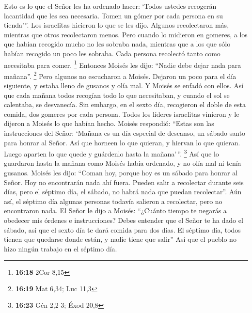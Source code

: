  Esto es lo que el Señor les ha ordenado hacer: `Todos
ustedes recogerán lacantidad que les sea necesaria. Tomen un gómer por
cada persona en su tienda'''.  Los israelitas hicieron lo
que se les dijo. Algunos recolectaron más, mientras que otros
recolectaron menos.  Pero cuando lo midieron en gomeres,
a los que habían recogido mucho no les sobraba nada, mientras que a los
que sólo habían recogido un poco les sobraba. Cada persona recolectó
tanto como necesitaba para comer. \footnote{\textbf{16:18} 2Cor 8,15}
 Entonces Moisés les dijo: ``Nadie debe dejar nada para
mañana''. \footnote{\textbf{16:19} Mat 6,34; Luc 11,3} 
Pero algunos no escucharon a Moisés. Dejaron un poco para el día
siguiente, y estaba lleno de gusanos y olía mal. Y Moisés se enfadó con
ellos.  Así que cada mañana todos recogían todo lo que
necesitaban, y cuando el sol se calentaba, se desvanecía.
 Sin embargo, en el sexto día, recogieron el doble de
esta comida, dos gomeres por cada persona. Todos los líderes israelitas
vinieron y le dijeron a Moisés lo que habían hecho. 
Moisés respondió: ``Estas son las instrucciones del Señor: `Mañana es un
día especial de descanso, un sábado santo para honrar al Señor. Así que
horneen lo que quieran, y hiervan lo que quieran. Luego aparten lo que
quede y guárdenlo hasta la mañana'\,''. \footnote{\textbf{16:23} Gén
  2,2-3; Éxod 20,8}  Así que lo guardaron hasta la mañana
como Moisés había ordenado, y no olía mal ni tenía gusanos.
 Moisés les dijo: ``Coman hoy, porque hoy es un sábado
para honrar al Señor. Hoy no encontrarán nada ahí fuera. 
Pueden salir a recolectar durante seis días, pero el séptimo día, el
sábado, no habrá nada que puedan recolectar''.  Aún así,
el séptimo día algunas personas todavía salieron a recolectar, pero no
encontraron nada.  El Señor le dijo a Moisés: ``¿Cuánto
tiempo te negarás a obedecer mis órdenes e instrucciones?
 Debes entender que el Señor te ha dado el sábado, así
que el sexto día te dará comida para dos días. El séptimo día, todos
tienen que quedarse donde están, y nadie tiene que salir''
 Así que el pueblo no hizo ningún trabajo en el séptimo
día.

